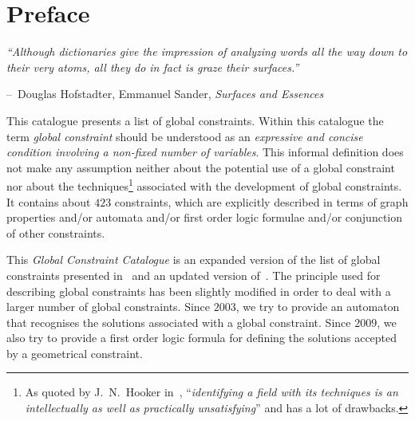 \dominitoc
\makeatletter
\newenvironment{chapquote}[2][2em]
  {\setlength{\@tempdima}{#1}%
   \def\chapquote@author{#2}%
   \parshape 1 \@tempdima \dimexpr\textwidth-2\@tempdima\relax%
   \itshape}
  {\par\normalfont\hfill--\ \chapquote@author\hspace*{\@tempdima}\par\bigskip}
\renewcommand\l@section{\@dottedtocline{1}{1.1em}{3.6em}}
\renewcommand\l@subsection{\@dottedtocline{2}{1.1em}{3.6em}}
\renewcommand\l@subsubsection{\@dottedtocline{3}{1.1em}{3.6em}}
\renewcommand\l@paragraph{\@dottedtocline{4}{1.1em}{3.6em}}
\renewcommand\l@subparagraph{\@dottedtocline{5}{1.1em}{3.6em}}
\makeatother
\setcounter{minitocdepth}{5}
\tableofcontents


\frontmatter
\chapter{Preface}

\begin{chapquote}{Douglas Hofstadter, Emmanuel Sander, \textit{Surfaces and Essences}}
``Although dictionaries give the impression of analyzing words all the way down to their very atoms, all they do in fact is graze their surfaces.''
\end{chapquote}

This catalogue presents a list of global constraints. Within this catalogue the term \emph{global constraint} should be understood as an \emph{expressive and concise condition involving a non\nobreakdash-fixed number of variables}. This informal definition does not make any assumption neither about the potential use of a global constraint nor about the techniques\footnote{As quoted by J.~N.~Hooker in~\cite{Hooker07}, ``\emph{identifying a field with its techniques is an intellectually as well as practically unsatisfying}'' and has a lot of drawbacks.} associated with the development of global constraints. It contains about $423$ constraints, which are explicitly described in terms of graph properties and/or automata and/or first order logic formulae and/or conjunction of other constraints.

This \emph{Global Constraint Catalogue} is an expanded version of the list of global constraints presented in~\cite{BeldiceanuR00} and an updated version of~\cite{BeldiceanuCarlssonRampon05}. The principle used for describing global constraints has been slightly modified in order to deal with a larger number of global constraints. Since $2003$, we try to provide an automaton that recognises the solutions associated with a global constraint. Since $2009$, we also try to provide a first order logic formula for defining the solutions accepted by a geometrical constraint.


